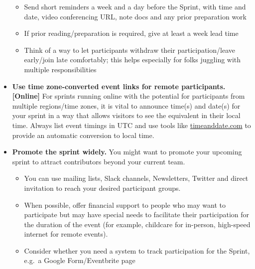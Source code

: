 \documentclass[
]{book}
\providecommand{\tightlist}{%
  \setlength{\itemsep}{0pt}\setlength{\parskip}{0pt}}
\begin{document}
\begin{itemize}
  \begin{itemize}
  \tightlist
  \item
    Send short reminders a week and a day before the Sprint, with time and date, video conferencing URL, note docs and any prior preparation work
  \item
    If prior reading/preparation is required, give at least a week lead time
  \item
    Think of a way to let participants withdraw their participation/leave early/join late comfortably; this helps especially for folks juggling with multiple responsibilities
  \end{itemize}
\item
  \textbf{Use time zone-converted event links for remote participants.}
  \textbf{{[}Online{]}} For sprints running online with the potential for participants from multiple
  regions/time zones,
  it is vital to announce time(s) and date(s) for your sprint in a way that
  allows visitors to see the equivalent in their local time.
  Always list event timings in UTC and use tools like \href{https://timeanddate.com}{timeanddate.com} to provide an automatic conversion to local time.
\item
  \textbf{Promote the sprint widely.} You might want to promote your upcoming sprint to attract contributors beyond your current team.

  \begin{itemize}
  \tightlist
  \item
    You can use mailing lists, Slack channels, Newsletters, Twitter and direct invitation to reach your desired participant groups.
  \item
    When possible, offer financial support to people who may want to participate but may have special needs to facilitate their participation for the duration of the event (for example, childcare for in-person, high-speed internet for remote events).
  \item
    Consider whether you need a system to track participation for the Sprint, e.g.~a Google Form/Eventbrite page


\end{itemize}
\end{itemize}
\end{document}
